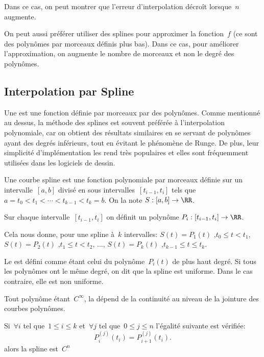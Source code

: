 Dans ce cas, on peut montrer que l'erreur d'interpolation décroît lorsque~$n$ augmente.

On peut aussi préférer utiliser des splines pour approximer la fonction~$f$ (ce sont des polynômes 
par morceaux définis plus bas). Dans ce cas, pour améliorer l'approximation, on augmente le nombre de 
morceaux et non le degré des polynômes.


\medskip
\subsection{Interpolation par Spline}

Une  est une fonction définie par morceaux par des polynômes.
Comme mentionné au dessus, la méthode des splines est souvent préférée à l'interpolation 
polynomiale, car on obtient des résultats similaires en se servant de polynômes ayant des degrés 
inférieurs, tout en évitant le phénomène de Runge.
De plus, leur simplicité d'implémentation les rend très populaires et elles sont fréquemment utilisées 
dans les logiciels de dessin.

\medskip
Une courbe spline est une fonction polynomiale par morceaux définie sur un intervalle~$[a,b]$ divisé 
en sous intervalles~$[t_{i-1}, t_i]$ tels que~$a = t_0 < t_1 < \cdots < t_{k-1} < t_k = b$. On la note 
$S: [a,b]\to \RR$.

Sur chaque intervalle~$[t_{i-1}, t_i]$ on définit un polynôme
$ P_i: [t_{i-1}, t_i] \to \RR$.

Cela nous donne, pour une spline à~$k$ intervalles:
$S(t) = P_1 (t) \mbox{ ,} t_0 \le t < t_1$, $S(t) = P_2 (t) \mbox{ ,} t_1 \le t < t_2$, ..., 
$S(t) = P_k (t) \mbox{ ,} t_{k-1} \le t \le t_k$.

\medskip
Le  est défini comme étant celui du polynôme~$P_i (t)$ de plus haut 
degré. Si tous les polynômes ont le même degré, on dit que la spline est uniforme. Dans le cas contraire, 
elle est non uniforme.

\medskip
Tout polynôme étant~$C^\infty$, la  dépend de la continuité 
au niveau de la jointure des courbes polynômes.

Si~$\forall i$ tel que~$1 \le i \le k$ et~$\forall j$ tel que~$0 \le j \le n$ l'égalité suivante est vérifiée:
\begin{equation}
  P_i^{(j)} (t_i) = P_{i+1}^{(j)} (t_i).
\end{equation}
alors la spline est~$C^n$


